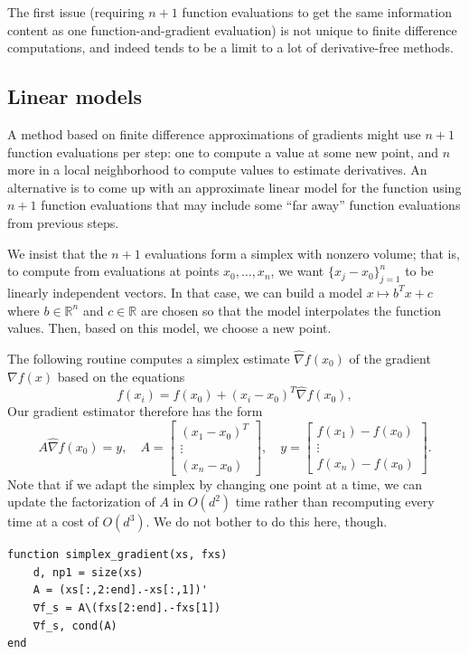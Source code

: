 \documentclass[12pt, leqno]{article} %
\begin{document}
The first issue (requiring \(n+1\) function evaluations to get the same
information content as one function-and-gradient evaluation) is not
unique to finite difference computations, and indeed tends to be a limit
to a lot of derivative-free methods.

\subsection{Linear models}

A method based on finite difference approximations of gradients might
use \(n+1\) function evaluations per step: one to compute a value at
some new point, and \(n\) more in a local neighborhood to compute values
to estimate derivatives. An alternative is to come up with an
approximate linear model for the function using \(n+1\) function
evaluations that may include some ``far away'' function evaluations from
previous steps.

We insist that the \(n+1\) evaluations form a simplex with nonzero
volume; that is, to compute from evaluations at points
\(x_0, \ldots, x_n\), we want \(\{ x_j-x_0 \}_{j=1}^n\) to be linearly
independent vectors. In that case, we can build a model
\(x \mapsto b^T x + c\) where \(b \in \mathbb{R}^n\) and
\(c \in \mathbb{R}\) are chosen so that the model interpolates the
function values. Then, based on this model, we choose a new point.

The following routine computes a simplex estimate
\(\hat{\nabla} f(x_0)\) of the gradient \(\nabla f(x)\) based on the
equations \[f(x_i) = f(x_0) + (x_i-x_0)^T \hat{\nabla} f(x_0),\] Our
gradient estimator therefore has the form
\[A \hat{\nabla} f(x_0) = y, \quad 
  A = \begin{bmatrix} (x_1-x_0)^T \\ \vdots \\ (x_n-x_0) \end{bmatrix}, \quad
  y = \begin{bmatrix} f(x_1) - f(x_0) \\ \vdots \\ f(x_n)-f(x_0) \end{bmatrix}.\]
Note that if we adapt the simplex by changing one point at a time, we
can update the factorization of \(A\) in \(O(d^2)\) time rather than
recomputing every time at a cost of \(O(d^3)\). We do not bother to do
this here, though.

\begin{verbatim}
function simplex_gradient(xs, fxs)
    d, np1 = size(xs)
    A = (xs[:,2:end].-xs[:,1])'
    ∇f_s = A\(fxs[2:end].-fxs[1])
    ∇f_s, cond(A)
end
\end{verbatim}
\end{document}

